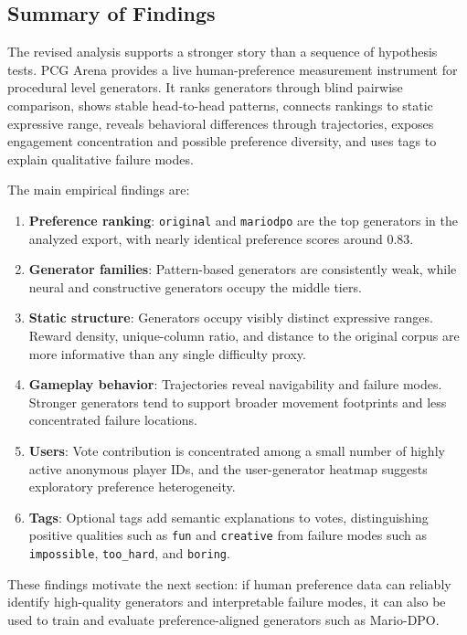 \documentclass[11pt,a4paper]{article}
\theoremstyle{plain}
\theoremstyle{definition}
\theoremstyle{remark}
\begin{document}
\subsection{Summary of Findings}
\label{subsec:eda-findings-summary}

The revised analysis supports a stronger story than a sequence of hypothesis tests. PCG Arena provides a live human-preference measurement instrument for procedural level generators. It ranks generators through blind pairwise comparison, shows stable head-to-head patterns, connects rankings to static expressive range, reveals behavioral differences through trajectories, exposes engagement concentration and possible preference diversity, and uses tags to explain qualitative failure modes.

The main empirical findings are:

\begin{enumerate}
    \item \textbf{Preference ranking}: \texttt{original} and \texttt{mariodpo} are the top generators in the analyzed export, with nearly identical preference scores around 0.83.
    \item \textbf{Generator families}: Pattern-based generators are consistently weak, while neural and constructive generators occupy the middle tiers.
    \item \textbf{Static structure}: Generators occupy visibly distinct expressive ranges. Reward density, unique-column ratio, and distance to the original corpus are more informative than any single difficulty proxy.
    \item \textbf{Gameplay behavior}: Trajectories reveal navigability and failure modes. Stronger generators tend to support broader movement footprints and less concentrated failure locations.
    \item \textbf{Users}: Vote contribution is concentrated among a small number of highly active anonymous player IDs, and the user-generator heatmap suggests exploratory preference heterogeneity.
    \item \textbf{Tags}: Optional tags add semantic explanations to votes, distinguishing positive qualities such as \texttt{fun} and \texttt{creative} from failure modes such as \texttt{impossible}, \texttt{too\_hard}, and \texttt{boring}.
\end{enumerate}

These findings motivate the next section: if human preference data can reliably identify high-quality generators and interpretable failure modes, it can also be used to train and evaluate preference-aligned generators such as Mario-DPO.
\end{document}
